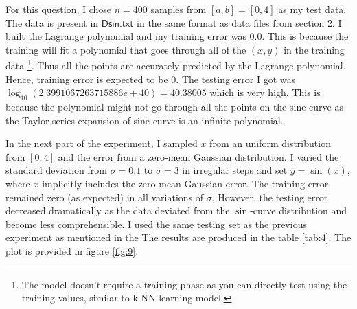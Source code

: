 \documentclass[a4paper]{article}
\theoremstyle{definition}
\newenvironment{soln}{
    \leavevmode\color{blue}\ignorespaces
}{}
\begin{document}
\begin{soln}
    For this question, I chose $n = 400$ samples from $[a, b] = [0, 4]$ as my test data.
    The data is present in $\mathsf{Dsin.txt}$ in the same format as data files from section 2.
    I built the Lagrange polynomial and my training error was 0.0.
    This is because the training will fit a polynomial that goes through all of the $(x, y)$ in the training data \footnote{The model doesn't require a training phase as you can directly test using the training values, similar to k-NN learning model.}.
    Thus all the points are accurately predicted by the Lagrange polynomial.
    Hence, training error is expected to be 0.
    The testing error I got was $\log_{10}(2.3991067263715886e+40) = 40.38005$ which is very high.
    This is because the polynomial might not go through all the points on the sine curve as the Taylor-series expansion of sine curve is an infinite polynomial.

    In the next part of the experiment, I sampled $x$ from an uniform distribution from $[0, 4]$ and the error from a zero-mean Gaussian distribution.
    I varied the standard deviation from $\sigma = 0.1 \text{ to } \sigma = 3$ in irregular steps and set $y = \sin(x)$, where $x$ implicitly includes the zero-mean Gaussian error.
    The training error remained zero (as expected) in all variations of $\sigma$.
    However, the testing error decreased dramatically as the data deviated from the $\sin$-curve distribution and become less comprehensible.
    I used the same testing set as the previous experiment as mentioned in the 
    The results are produced in the table \ref{tab:4}.
    The plot is provided in figure \ref{fig:9}.


\end{soln}
\end{document}
